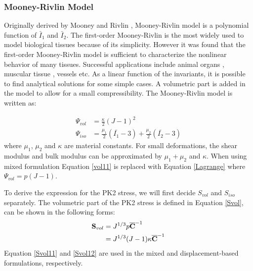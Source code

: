 \subsubsection{Mooney-Rivlin Model}
Originally derived by Mooney \cite{Mooney} and Rivlin \cite{Rivlin}, Mooney-Rivlin model is a polynomial function of $\bar{I}_1$ and $\bar{I}_2$. The first-order Mooney-Rivlin is the most widely used to model biological tissues because of its simplicity. However it was found that the first-order Mooney-Rivlin model is sufficient to characterize the nonlinear behavior of many tissues. Successful applications include animal organs \cite{Wall}, muscular tissue \cite{Bols2}, vessels \cite{Navidbakhsh} etc. As a linear function of the invariants, it is possible to find analytical solutions for some simple cases. A volumetric part is added in the model to allow for a small compressibility. The Mooney-Rivlin model is written as:

\begin{subequations}
\label{Mooney}
\begin{align}
\Psi_{vol} &= \frac{\kappa}{2}(J - 1)^2 \label{vol11} \\
\Psi_{iso} &= \frac{\mu_1}{2}(\bar{I_1} - 3) + \frac{\mu_2}{2}(\bar{I_2} - 3) \label{iso1}
\end{align}
\end{subequations}
where $\mu_1$, $\mu_2$ and $\kappa$ are material constants. For small deformations, the shear modulus and bulk modulus can be approximated by $\mu_1+\mu_2$ and $\kappa$. When using mixed formulation Equation \ref{vol11} is replaced with Equation \ref{Lagrange} where $\Psi_{vol} = p(J - 1) $.


To derive the expression for the PK2 stress, we will first decide $S_{vol}$ and $S_{iso}$ separately. The volumetric part of the PK2 stress is defined in Equation \ref{Svol}, can be shown in the following forms:
\begin{subequations}
\label{Svol1}
\begin{align}
\bold{S}_{vol} &= J^{1/3}p{\overline{\bold{C}}}^{-1} \label{Svol11}\\
		      &= {J^{1/3}(J-1)}\kappa {\overline{\bold{C}}}^{-1} \label{Svol12}
\end{align}
\end{subequations}
Equation \ref{Svol11} and \ref{Svol12} are used in the mixed and displacement-based formulations, respectively.


